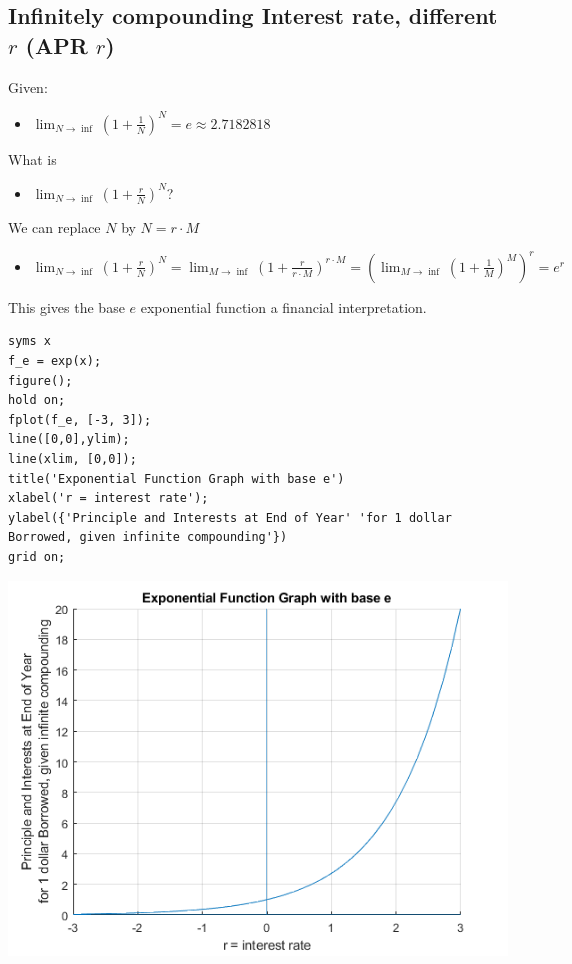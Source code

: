 \documentclass[
]{book}
\providecommand{\tightlist}{%
  \setlength{\itemsep}{0pt}\setlength{\parskip}{0pt}}
\begin{document}
\hypertarget{infinitely-compounding-interest-rate-different-r-apr-r}{%
\subsection{\texorpdfstring{Infinitely compounding Interest rate, different \(r\) (APR \(r\))}{Infinitely compounding Interest rate, different r (APR r)}}\label{infinitely-compounding-interest-rate-different-r-apr-r}}

Given:

\begin{itemize}
\tightlist
\item
  \(\displaystyle \lim_{N\to \inf } (1+\frac{1}{N})^N =e\approx 2.7182818\)
\end{itemize}

What is

\begin{itemize}
\tightlist
\item
  \(\lim_{N\to \inf } (1+\frac{r}{N})^N\)?
\end{itemize}

We can replace \(N\) by \(N=r\cdot M\)

\begin{itemize}
\tightlist
\item
  \(\displaystyle \lim_{N\to \inf } (1+\frac{r}{N})^N =\lim_{M\to \inf } (1+\frac{r}{r\cdot M})^{r\cdot M} ={\left(\lim_{M\to \inf } (1+\frac{1}{M})^M \right)}^r =e^r\)
\end{itemize}

This gives the base \(e\) exponential function a financial interpretation.

\begin{verbatim}
syms x
f_e = exp(x);
figure();
hold on;
fplot(f_e, [-3, 3]);
line([0,0],ylim);
line(xlim, [0,0]);
title('Exponential Function Graph with base e')
xlabel('r = interest rate');
ylabel({'Principle and Interests at End of Year' 'for 1 dollar Borrowed, given infinite compounding'})
grid on;
\end{verbatim}

\includegraphics[width=5.20833in,height=\textheight]{img/exponential_images/figure_2.png}
\end{document}
